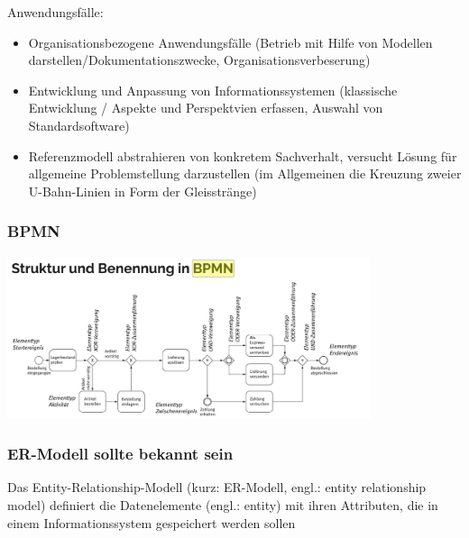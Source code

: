 Anwendungsfälle:
\begin{itemize}
 \item Organisationsbezogene Anwendungsfälle (Betrieb mit Hilfe von Modellen darstellen/Dokumentationszwecke, Organisationsverbeserung)
 \item Entwicklung und Anpassung von Informationssystemen (klassische Entwicklung / Aspekte und Perspektvien erfassen, Auswahl von Standardsoftware)
 \item Referenzmodell abstrahieren von konkretem Sachverhalt, versucht Lösung für allgemeine Problemstellung darzustellen  (im Allgemeinen die Kreuzung zweier U-Bahn-Linien in Form der Gleisstränge)
\end{itemize}
\subsubsection{BPMN}
\includegraphics[width=0.8\textwidth]{assets/BPMN.PNG}
\subsubsection{ER-Modell sollte bekannt sein}
Das Entity-Relationship-Modell (kurz: ER-Modell, engl.: entity relationship model) definiert die Datenelemente (engl.: entity) mit ihren Attributen, die in einem Informationssystem gespeichert werden sollen


